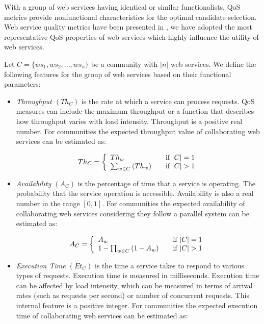 \documentclass[10pt,journal,cspaper,compsoc]{IEEEtran}
\begin{document}
With a group of web services having identical or similar functionalists, QoS metrics provide nonfunctional characteristics for the optimal candidate selection. Web service quality metrics have been presented in \cite{Ardagna:2007:ASC:1263152.1263531,Menasce:2002:QIW:613357.613758,10.1109/ISSRE.2011.17}, we have adopted the most representative QoS properties of web services which highly influence the utility of web services. 

Let $C = \{ws_1,ws_2,..., ws_n\}$ be a community with $|n|$ web services. We define the following features for the group of web services based on their functional parameters:

\begin{itemize}

  \item \emph{Throughput $(Th_{C})$} is the rate at which a service can process requests. QoS measures can include the maximum throughput or a function that describes how throughput varies with load intensity. Throughput is a positive real number. For communities the expected throughput value of collaborating web services can be estimated as:
	
	\begin{equation}
		 Th_{C} = \left\{ 
			\begin{array}{l l}
				Th_{w} & \quad \text{if $|C| = 1$}\\
				\sum_{w \in C}{(Th_{w})} & \quad \text{if $|C| > 1$}
			\end{array} \right.
	\end{equation}
	
	\item \emph{Availability $(A_{C})$} is the percentage of time that a service is operating.
	The probability that the service operation is accessible. Availability is also a real number in the range $[0, 1]$. For communities the expected availability of collaborating web services considering they follow a parallel system can be estimated as:
	
	\begin{equation}
		A_{C} = \left\{ 
			\begin{array}{l l}
				A_{w} & \quad \text{if $|C| = 1$}\\
				1-\prod_{w \in C}{(1-A_{w})} & \quad \text{if $|C| > 1$}
			\end{array} \right.
	\end{equation}
	
	\item \emph{Execution Time $(Et_{C})$} is the time a service takes to respond to various types of requests. 
	Execution time is measured in milliseconds. Execution time can be affected by load intensity, which can be measured in terms of arrival rates (such as requests per second) or number of concurrent requests. This internal feature is a positive integer. For communities the expected execution time of collaborating web services can be estimated as:
	

\end{itemize}
\end{document}
